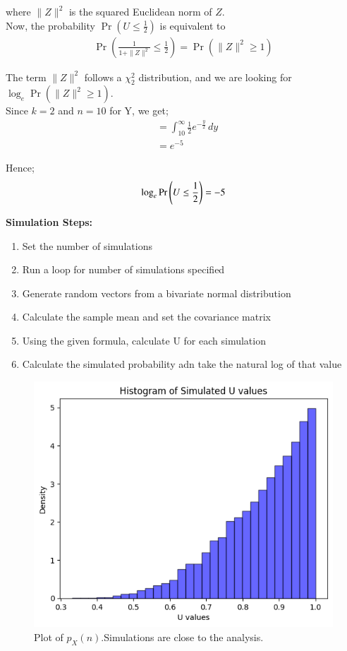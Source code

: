 \documentclass[journal,12pt,onecolumn]{IEEEtran}
\theoremstyle{remark}
\begin{document}
where $\|Z\|^2$ is the squared Euclidean norm of $Z$.\\

Now, the probability $\Pr(U \leq \frac{1}{2})$ is equivalent to 
\begin{align}
    \Pr\left(\frac{1}{1 + \|Z\|^2} \leq \frac{1}{2}\right)
    = \Pr(\|Z\|^2 \geq 1)
\end{align}

The term $\|Z\|^2$ follows a $\chi^{2}_{2}$ distribution, and we are looking for $\log_e \Pr(\|Z\|^2 \geq 1)$.\\

Since $k=2$ and $n=10$ for Y, we get;
\begin{align}
    &= \int_{10}^{\infty} \frac{1}{2}e^{-\frac{y}{2}} \,dy\\
    &= e^{-5}   
\end{align}   

Hence;
\begin{align}
    \log_e \Pr\left(U \le \frac{1}{2}\right) = -5
\end{align}

\textbf{Simulation Steps:}
\begin{enumerate}
    \item Set the number of simulations
    \item Run a loop for number of simulations specified
    \item Generate random vectors from a bivariate normal distribution
    \item Calculate the sample mean and set the covariance matrix
    \item Using the given formula, calculate U for each simulation
    \item Calculate the simulated probability adn take the natural log of that value
\end{enumerate}

\begin{figure}[!ht]
    \centering
    \includegraphics[width=\columnwidth]{./figs/sim.png}
    \caption{Plot of $p_X(n)$.Simulations are close to the analysis. }
    \end{figure}
\end{document}
